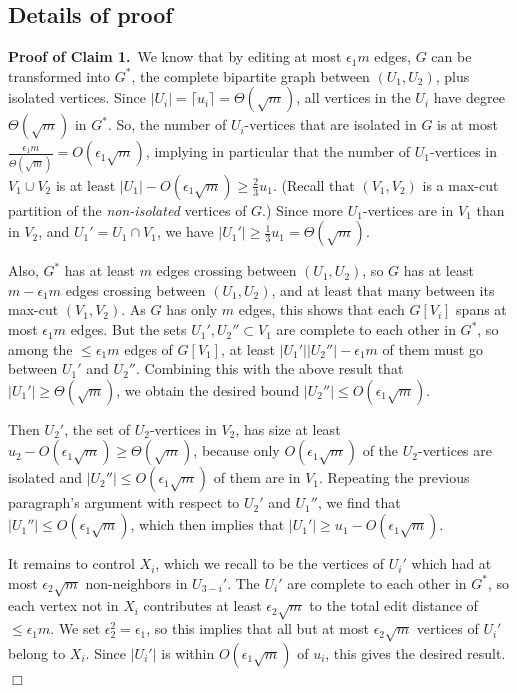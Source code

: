 \documentclass[11pt]{article}
\begin{document}
\subsection{Details of proof}
\label{sec:exact:sparse:details}


\noindent \textbf{Proof of Claim 1.}\, We know that by editing at most
$\epsilon_1 m$ edges, $G$ can be transformed into $G^*$, the complete
bipartite graph between $(U_1, U_2)$, plus isolated vertices.  Since
$|U_i| = \lceil u_i \rceil = \Theta(\sqrt{m})$, all vertices in the
$U_i$ have degree $\Theta(\sqrt{m})$ in $G^*$.  So, the number of
$U_i$-vertices that are isolated in $G$ is at most $\frac{\epsilon_1
  m}{\Theta(\sqrt{m})} = O(\epsilon_1 \sqrt{m})$, implying in
particular that the number of $U_1$-vertices in $V_1 \cup V_2$ is at
least $|U_1| - O(\epsilon_1 \sqrt{m}) \geq \frac{2}{3} u_1$.  (Recall
that $(V_1, V_2)$ is a max-cut partition of the \emph{non-isolated}
vertices of $G$.)  Since more $U_1$-vertices are in $V_1$ than in
$V_2$, and $U_1' = U_1 \cap V_1$, we have $|U_1'| \geq \frac{1}{3} u_1
= \Theta(\sqrt{m})$.

Also, $G^*$ has at least $m$ edges crossing between $(U_1, U_2)$, so
$G$ has at least $m-\epsilon_1 m$ edges crossing between $(U_1, U_2)$,
and at least that many between its max-cut $(V_1, V_2)$.  As $G$ has
only $m$ edges, this shows that each $G[V_i]$ spans at most
$\epsilon_1 m$ edges.  But the sets $U_1', U_2'' \subset V_1$ are
complete to each other in $G^*$, so among the $\leq \epsilon_1 m$
edges of $G[V_1]$, at least $|U_1'| |U_2''| - \epsilon_1 m$ of them
must go between $U_1'$ and $U_2''$.  Combining this with the above
result that $|U_1'| \geq \Theta(\sqrt{m})$, we obtain the desired
bound $|U_2''| \leq O(\epsilon_1 \sqrt{m})$.

Then $U_2'$, the set of $U_2$-vertices in $V_2$, has size at least
$u_2 - O(\epsilon_1 \sqrt{m}) \geq \Theta(\sqrt{m})$, because only
$O(\epsilon_1 \sqrt{m})$ of the $U_2$-vertices are isolated and
$|U_2''| \leq O(\epsilon_1 \sqrt{m})$ of them are in $V_1$.  Repeating
the previous paragraph's argument with respect to $U_2'$ and $U_1''$,
we find that $|U_1''| \leq O(\epsilon_1 \sqrt{m})$, which then implies
that $|U_1'| \geq u_1 - O(\epsilon_1 \sqrt{m})$.

It remains to control $X_i$, which we recall to be the vertices of
$U_i'$ which had at most $\epsilon_2\sqrt{m}$ non-neighbors in
$U_{3-i}'$.  The $U_i'$ are complete to each other in $G^*$, so each
vertex not in $X_i$ contributes at least $\epsilon_2\sqrt{m}$ to the
total edit distance of $\leq \epsilon_1 m$.  We set $\epsilon_2^2 =
\epsilon_1$, so this implies that all but at most $\epsilon_2
\sqrt{m}$ vertices of $U_i'$ belong to $X_i$.  Since $|U_i'|$ is
within $O(\epsilon_1 \sqrt{m})$ of $u_i$, this gives the desired
result.  \hfill $\Box$
\end{document}
